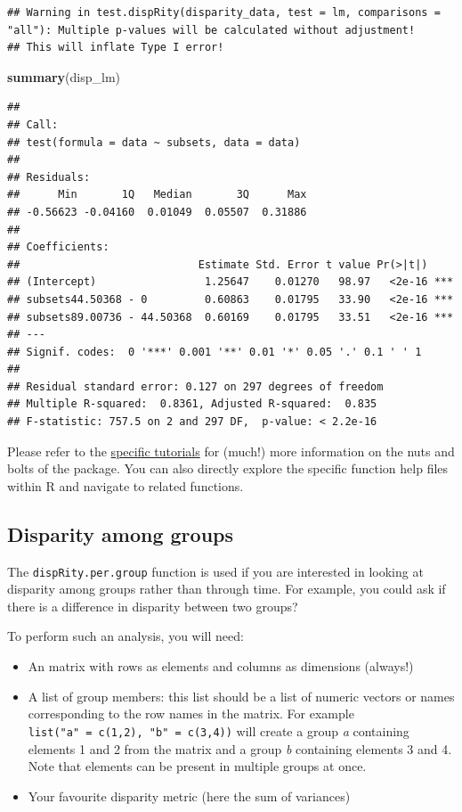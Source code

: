 \documentclass[]{book}
\newenvironment{Shaded}{\begin{snugshade}}{\end{snugshade}}
\newcommand{\KeywordTok}[1]{\textcolor[rgb]{0.13,0.29,0.53}{\textbf{#1}}}
\newcommand{\NormalTok}[1]{#1}
\providecommand{\tightlist}{%
  \setlength{\itemsep}{0pt}\setlength{\parskip}{0pt}}
\theoremstyle{definition}
\theoremstyle{definition}
\theoremstyle{remark}
\begin{document}
\begin{verbatim}
## Warning in test.dispRity(disparity_data, test = lm, comparisons = "all"): Multiple p-values will be calculated without adjustment!
## This will inflate Type I error!
\end{verbatim}

\begin{Shaded}
\begin{Highlighting}[]
\KeywordTok{summary}\NormalTok{(disp_lm)}
\end{Highlighting}
\end{Shaded}

\begin{verbatim}
## 
## Call:
## test(formula = data ~ subsets, data = data)
## 
## Residuals:
##      Min       1Q   Median       3Q      Max 
## -0.56623 -0.04160  0.01049  0.05507  0.31886 
## 
## Coefficients:
##                            Estimate Std. Error t value Pr(>|t|)    
## (Intercept)                 1.25647    0.01270   98.97   <2e-16 ***
## subsets44.50368 - 0         0.60863    0.01795   33.90   <2e-16 ***
## subsets89.00736 - 44.50368  0.60169    0.01795   33.51   <2e-16 ***
## ---
## Signif. codes:  0 '***' 0.001 '**' 0.01 '*' 0.05 '.' 0.1 ' ' 1
## 
## Residual standard error: 0.127 on 297 degrees of freedom
## Multiple R-squared:  0.8361, Adjusted R-squared:  0.835 
## F-statistic: 757.5 on 2 and 297 DF,  p-value: < 2.2e-16
\end{verbatim}

Please refer to the \protect\hyperlink{specific-tutorial}{specific
tutorials} for (much!) more information on the nuts and bolts of the
package. You can also directly explore the specific function help files
within R and navigate to related functions.

\hypertarget{disparity-among-groups}{\subsection{Disparity among
groups}\label{disparity-among-groups}}

The \texttt{dispRity.per.group} function is used if you are interested
in looking at disparity among groups rather than through time. For
example, you could ask if there is a difference in disparity between two
groups?

To perform such an analysis, you will need:

\begin{itemize}
\tightlist
\item
  An matrix with rows as elements and columns as dimensions (always!)
\item
  A list of group members: this list should be a list of numeric vectors
  or names corresponding to the row names in the matrix. For example
  \texttt{list("a"\ =\ c(1,2),\ "b"\ =\ c(3,4))} will create a group
  \emph{a} containing elements 1 and 2 from the matrix and a group
  \emph{b} containing elements 3 and 4. Note that elements can be
  present in multiple groups at once.
\item
  Your favourite disparity metric (here the sum of variances)
\end{itemize}
\end{document}
